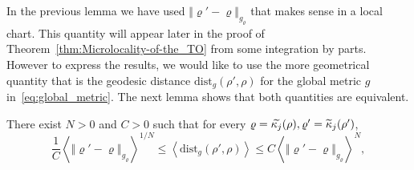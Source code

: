 \documentclass[AHL,Unicode,longabstracts,published]{cedram}
\newcommand{\dist}{\mathrm{dist}}
\let\oldtilde\tilde
\renewcommand*{\tilde}[1]{\mathchoice{\widetilde{#1}}{\widetilde{#1}}{\oldtilde{#1}}{\oldtilde{#1}}}
\begin{document}
In the previous lemma we have used $\Vert \varrho'-\varrho\Vert _{g_{\varrho}}$ that makes sense in a local chart. This quantity will appear later in the proof of Theorem~\ref{thm:Microlocality-of-the_TO} from some integration by parts. However to express the results, we would like to use the more geometrical quantity that is the geodesic distance $\dist_{g}(\rho',\rho)$ for the global metric $g$ in~\eqref{eq:global_metric}. The next lemma shows that both quantities are equivalent.

\begin{cBoxB}{}
\begin{lemm}\label{lem:There-exist-}
There exist $N>0$ and $C>0$ such that for every $\varrho=\tilde{\kappa_{j}}(\rho),\varrho'=\tilde{\kappa}_{j}(\rho')$,
\begin{equation}\label{eq:log_log}
\frac{1}{C}\left\langle \left\Vert \varrho'-\varrho\right\Vert _{g_{\varrho}}\right\rangle ^{1/N}\leq\left\langle \dist_{g}\left(\rho',\rho\right)\right\rangle \leq C\left\langle \left\Vert \varrho'-\varrho\right\Vert _{g_{\varrho}}\right\rangle ^{N},
\end{equation}
\end{lemm}
\end{cBoxB}
\end{document}
